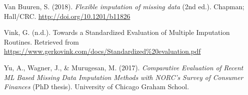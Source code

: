 \documentclass[12pt,oneside]{chicagocapstone}
\begin{document}
\hypertarget{ref-van_buuren_flexible_2018}{}
Van Buuren, S. (2018). \emph{Flexible imputation of missing data} (2nd
ed.). Chapman; Hall/CRC. \url{http://doi.org/10.1201/b11826}

\hypertarget{ref-vink_towards_nodate}{}
Vink, G. (n.d.). Towards a Standardized Evaluation of Multiple
Imputation Routines. Retrieved from
\url{https://www.gerkovink.com/docs/Standardized\%20evaluation.pdf}

\hypertarget{ref-yu_comparative_2017}{}
Yu, A., Wagner, J., \& Murugesan, M. (2017). \emph{Comparative
Evaluation of Recent ML Based Missing Data Imputation Methods with
NORC's Survey of Consumer Finances} (PhD thesis). University of Chicago
Graham School.


\end{document}
